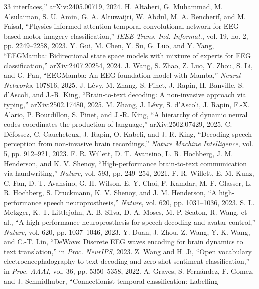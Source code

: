 \documentclass[conference]{IEEEtran}
\begin{document}
\begin{thebibliography}{33}
interfaces,'' arXiv:2405.00719, 2024.
 H. Altaheri, G. Muhammad, M. Alsulaiman,
S. U. Amin, G. A. Altuwaijri, W. Abdul, M. A. Bencherif, and M. Faisal,
``Physics-informed attention temporal convolutional network for EEG-based
motor imagery classification,'' \emph{IEEE Trans. Ind. Informat.}, vol. 19,
no. 2, pp. 2249--2258, 2023.
 Y. Gui, M. Chen, Y. Su, G. Luo, and Y. Yang,
``EEGMamba: Bidirectional state space models with mixture of experts for EEG
classification,'' arXiv:2407.20254, 2024.
 J. Wang, S. Zhao, Z. Luo, Y. Zhou, S. Li, and
G. Pan, ``EEGMamba: An EEG foundation model with Mamba,'' \emph{Neural
Networks}, 107816, 2025.
 J. L\'evy, M. Zhang, S. Pinet, J. Rapin, H. Banville,
S. d'Ascoli, and J.-R. King, ``Brain-to-text decoding: A non-invasive
approach via typing,'' arXiv:2502.17480, 2025.
 M. Zhang, J. L\'evy, S. d'Ascoli, J. Rapin,
F.-X. Alario, P. Bourdillon, S. Pinet, and J.-R. King, ``A hierarchy of
dynamic neural codes coordinates the production of language,''
arXiv:2502.07429, 2025.
 C. D\'efossez, C. Caucheteux, J. Rapin, O. Kabeli,
and J.-R. King, ``Decoding speech perception from non-invasive brain
recordings,'' \emph{Nature Machine Intelligence}, vol. 5, pp. 912--921,
2023.
 F. R. Willett, D. T. Avansino, L. R. Hochberg,
J. M. Henderson, and K. V. Shenoy, ``High-performance brain-to-text
communication via handwriting,'' \emph{Nature}, vol. 593, pp. 249--254,
2021.
 F. R. Willett, E. M. Kunz, C. Fan, D. T. Avansino,
G. H. Wilson, E. Y. Choi, F. Kamdar, M. F. Glasser, L. R. Hochberg,
S. Druckmann, K. V. Shenoy, and J. M. Henderson, ``A high-performance speech
neuroprosthesis,'' \emph{Nature}, vol. 620, pp. 1031--1036, 2023.
 S. L. Metzger, K. T. Littlejohn, A. B. Silva,
D. A. Moses, M. P. Seaton, R. Wang, et al., ``A high-performance
neuroprosthesis for speech decoding and avatar control,'' \emph{Nature},
vol. 620, pp. 1037--1046, 2023.
 Y. Duan, J. Zhou, Z. Wang, Y.-K. Wang, and C.-T.
Lin, ``DeWave: Discrete EEG waves encoding for brain dynamics to text
translation,'' in \emph{Proc. NeurIPS}, 2023.
 Z. Wang and H. Ji, ``Open vocabulary
electroencephalography-to-text decoding and zero-shot sentiment
classification,'' in \emph{Proc. AAAI}, vol. 36, pp. 5350--5358, 2022.
 A. Graves, S. Fern\'andez, F. Gomez, and
J. Schmidhuber, ``Connectionist temporal classification: Labelling

\end{thebibliography}
\end{document}
